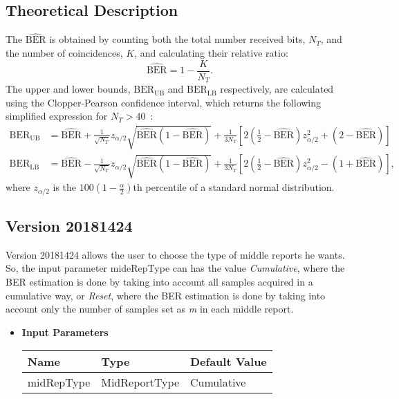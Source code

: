 \begin{refsection}
\subsection*{Theoretical Description}\label{bercalc}
The $\widehat{\text{BER}}$ is obtained by counting both the total number received bits, $N_T$, and the number of coincidences, $K$, and calculating their relative ratio:
\begin{equation}
\widehat{\text{BER}}=1-\frac{K}{N_T}.
\end{equation}
The upper and lower bounds, $\text{BER}_\text{UB}$ and $\text{BER}_\text{LB}$ respectively, are calculated using the Clopper-Pearson confidence interval, which returns the following simplified expression for $N_T>40$~\cite{Almeida16}:
\begin{align}
\text{BER}_\text{UB}&=\widehat{\text{BER}}+\frac{1}{\sqrt{N_T}}z_{\alpha/2}\sqrt{\widehat{\text{BER}}(1-\widehat{\text{BER}})}+\frac{1}{3N_T}\left[2\left(\frac{1}{2}-\widehat{\text{BER}}\right)z_{\alpha/2}^2+(2-\widehat{\text{BER}})\right]\\
\text{BER}_\text{LB}&=\widehat{\text{BER}}-\frac{1}{\sqrt{N_T}}z_{\alpha/2}\sqrt{\widehat{\text{BER}}(1-\widehat{\text{BER}})}+\frac{1}{3N_T}\left[2\left(\frac{1}{2}-\widehat{\text{BER}}\right)z_{\alpha/2}^2-(1+\widehat{\text{BER}})\right],
\end{align}
where $z_{\alpha/2}$ is the $100\left(1-\frac{\alpha}{2}\right)$th percentile of a standard normal distribution.

\subsection*{Version 20181424}

Version 20181424 allows the user to choose the type of middle reports he wants. So, the input parameter \textrm{mideRepType} can has the value \textit{Cumulative}, where the BER estimation is done by taking into account all samples acquired in a cumulative way, or \textit{Reset}, where the BER estimation is done by taking into account only the number of samples set as \textit{m} in each middle report.

\begin{itemize}
  \item \textbf{Input Parameters}
  \begin{table}[H]
    \centering
    \begin{tabular}{|l|l|l|}
    \hline
    Name           & Type           & Default Value     \\ \hline
    midRepType     & MidReportType  & Cumulative \\ \hline
    \end{tabular}
  \end{table}


\end{itemize}
\end{refsection}
